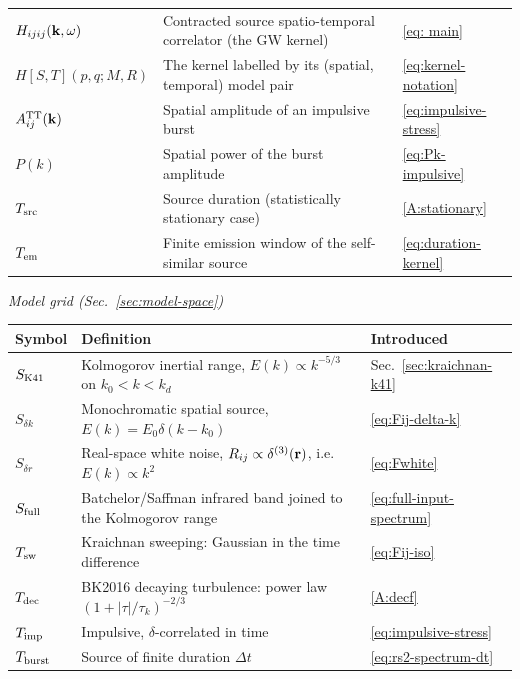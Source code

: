 \documentclass[10pt,prd,aps,nobibnotes,superscriptaddress,preprintnumbers,notitlepage]{revtex4-1}
\newcommand{\br}{{\bf r}}
\newcommand{\kb}{{\bf k}}
\begin{document}
\begin{tabular}{@{}p{} p{} p{}@{}}
$H_{ijij}(\kb,\omega)$ & Contracted source spatio-temporal correlator (the GW kernel) & \eqref{eq: main}\\
$H[S,T](p,q;M,R)$     & The kernel labelled by its (spatial, temporal) model pair & \eqref{eq:kernel-notation}\\
$A^{\rm TT}_{ij}(\kb)$ & Spatial amplitude of an impulsive burst & \eqref{eq:impulsive-stress}\\
$P(k)$                & Spatial power of the burst amplitude & \eqref{eq:Pk-impulsive}\\
$T_{\rm src}$         & Source duration (statistically stationary case) & \eqref{A:stationary}\\
$T_{\rm em}$          & Finite emission window of the self-similar source & \eqref{eq:duration-kernel}\\
\hline\hline
\end{tabular}\par

\medskip\noindent \emph{Model grid (Sec.~\ref{sec:model-space})}\par\nobreak\smallskip
\noindent\begin{tabular}{@{}p{} p{} p{}@{}}
\hline\hline
Symbol & Definition & Introduced \\
\hline
$S_{\rm K41}$         & Kolmogorov inertial range, $E(k)\propto k^{-5/3}$ on $k_0<k<k_d$ & Sec.~\ref{sec:kraichnan-k41}\\
$S_{\delta k}$        & Monochromatic spatial source, $E(k)=E_0\delta(k-k_0)$ & \eqref{eq:Fij-delta-k}\\
$S_{\delta r}$        & Real-space white noise, $R_{ij}\propto\delta^{(3)}(\br)$, i.e.\ $E(k)\propto k^2$ & \eqref{eq:Fwhite}\\
$S_{\rm full}$        & Batchelor/Saffman infrared band joined to the Kolmogorov range & \eqref{eq:full-input-spectrum}\\
$T_{\rm sw}$          & Kraichnan sweeping: Gaussian in the time difference & \eqref{eq:Fij-iso}\\
$T_{\rm dec}$         & BK2016 decaying turbulence: power law $(1+|\tau|/\tau_k)^{-2/3}$ & \eqref{A:decf}\\
$T_{\rm imp}$         & Impulsive, $\delta$-correlated in time & \eqref{eq:impulsive-stress}\\
$T_{\rm burst}$       & Source of finite duration $\Delta t$ & \eqref{eq:rs2-spectrum-dt}\\
\hline\hline
\end{tabular}\par
\end{document}
